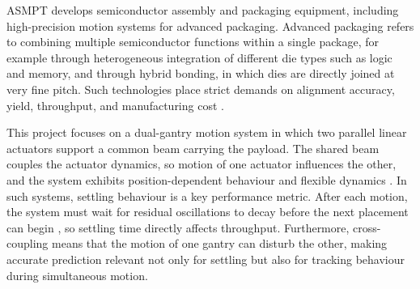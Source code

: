 ASMPT develops semiconductor assembly and packaging equipment, including high-precision motion systems for advanced packaging. Advanced packaging refers to combining multiple semiconductor functions within a single package, for example through heterogeneous integration of different die types such as logic and memory, and through hybrid bonding, in which dies are directly joined at very fine pitch.  Such technologies place strict demands on alignment accuracy, yield, throughput, and manufacturing cost \cite{irds2022,workman2021diewafer}. 

This project focuses on a dual-gantry motion system  in which two parallel linear actuators support a common beam carrying the payload. The shared beam couples the actuator dynamics, so motion of one actuator influences the other, and the system exhibits position-dependent behaviour and flexible dynamics \cite{garcia2013model, teo2007dynamic}.  In such systems, settling behaviour is a key performance metric. After each motion, the system must wait for residual oscillations to decay before the next placement can begin \cite{lambrechts2005trajectory}, so settling time directly affects throughput. Furthermore, cross-coupling means that the motion of one gantry can disturb the other, making accurate prediction relevant not only for settling but also for tracking behaviour during simultaneous motion.

